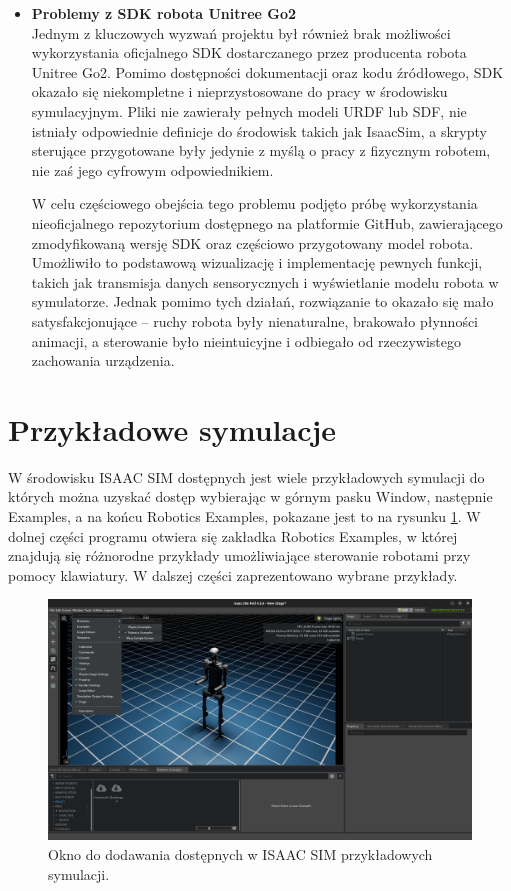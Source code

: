 \documentclass[12pt]{article}
\begin{document}
\begin{itemize}
  \item \textbf{Problemy z SDK robota Unitree Go2} \\
  Jednym z kluczowych wyzwań projektu był również brak możliwości wykorzystania oficjalnego SDK dostarczanego przez producenta robota Unitree Go2. Pomimo dostępności dokumentacji oraz kodu źródłowego, SDK okazało się niekompletne i nieprzystosowane do pracy w środowisku symulacyjnym. Pliki nie zawierały pełnych modeli URDF lub SDF, nie istniały odpowiednie definicje do środowisk takich jak IsaacSim, a skrypty sterujące przygotowane były jedynie z myślą o pracy z fizycznym robotem, nie zaś jego cyfrowym odpowiednikiem.

  W celu częściowego obejścia tego problemu podjęto próbę wykorzystania nieoficjalnego repozytorium dostępnego na platformie GitHub, zawierającego zmodyfikowaną wersję SDK oraz częściowo przygotowany model robota. Umożliwiło to podstawową wizualizację i implementację pewnych funkcji, takich jak transmisja danych sensorycznych i wyświetlanie modelu robota w symulatorze. Jednak pomimo tych działań, rozwiązanie to okazało się mało satysfakcjonujące -- ruchy robota były nienaturalne, brakowało płynności animacji, a sterowanie było nieintuicyjne i odbiegało od rzeczywistego zachowania urządzenia.

\end{itemize}

\section{Przykładowe symulacje}

W środowisku ISAAC SIM dostępnych jest wiele przykładowych symulacji do których można uzyskać dostęp wybierając w górnym pasku Window, następnie Examples, a na końcu Robotics Examples, pokazane jest to na rysunku \ref{fig:symulacje}.
W dolnej części programu otwiera się zakładka Robotics Examples, w której znajdują się różnorodne przykłady umożliwiające sterowanie robotami przy pomocy klawiatury. W dalszej części zaprezentowano wybrane przykłady.



\begin{figure}[h]
    \centering
    \includegraphics[width=0.8\linewidth]{Zdjęcia/oknoZPrzykladami.png}
    \caption{Okno do dodawania dostępnych w ISAAC SIM przykładowych symulacji.}
    \label{fig:symulacje}
\end{figure}
\end{document}

